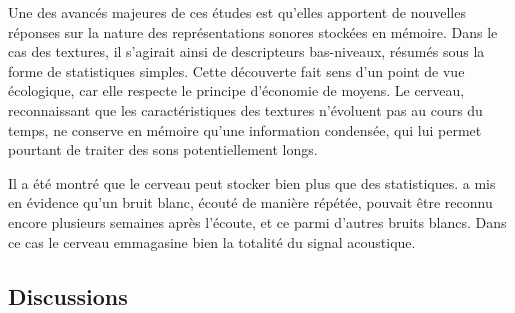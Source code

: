 {{Une des avancés majeures de ces études est qu'elles apportent de nouvelles réponses sur la nature des représentations sonores stockées en mémoire. Dans le cas des textures, il s'agirait ainsi de descripteurs bas-niveaux, résumés sous la forme de statistiques simples. Cette découverte fait sens d'un point de vue écologique, car elle respecte le principe d'économie de moyens. Le cerveau, reconnaissant que les caractéristiques des textures n'évoluent pas au cours du temps, ne conserve en mémoire qu'une information condensée, qui lui permet pourtant de traiter des sons potentiellement longs. 

Il a été montré que le cerveau peut stocker bien plus que des statistiques. \citep{agus2010rapid} a mis en évidence qu'un bruit blanc, écouté de manière répétée, pouvait être reconnu encore plusieurs semaines après l'écoute, et ce parmi d'autres bruits blancs. Dans ce cas le cerveau emmagasine bien la totalité du signal acoustique.

\subsection{Discussions}
\label{sec:ch3_textureDiscussion}



}}
